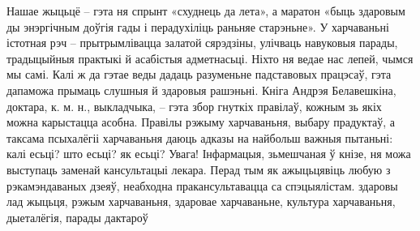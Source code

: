 Нашае жыцьцё – гэта ня спрынт «схуднець да лета», а маратон «быць здаровым ды энэргічным доўгія гады і перадухіліць раньняе старэньне». У харчаваньні істотная рэч – прытрымлівацца залатой сярэдзіны, улічваць навуковыя парады, традыцыйныя практыкі й асабістыя адметнасьці. Ніхто ня ведае нас лепей, чымся мы самі. Калі ж да гэтае веды дадаць разуменьне падставовых працэсаў, гэта дапаможа прымаць слушныя й здаровыя рашэньні.
Кніга Андрэя Белавешкіна, доктара, к. м. н., выкладчыка, – гэта збор гнуткіх правілаў, кожным зь якіх можна карыстацца асобна. Правілы рэжыму харчаваньня, выбару прадуктаў, а таксама псыхалёгіі харчаваньня даюць адказы на найбольш важныя пытаньні: калі есьці? што есьці? як есьці?
Увага! Інфармацыя, зьмешчаная ў кнізе, ня можа выступаць заменай кансультацыі лекара. Перад тым як ажыцьцявіць любую з рэкамэндаваных дзеяў, неабходна пракансультавацца са спэцыялістам.
здаровы лад жыцьця, рэжым харчаваньня, здаровае харчаваньне, культура харчаваньня, дыеталёгія, парады дактароў
